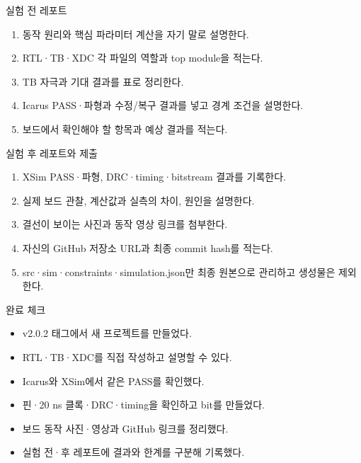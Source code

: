 \begin{frame}{실험 전 레포트}
\small
\begin{enumerate}
\item 동작 원리와 핵심 파라미터 계산을 자기 말로 설명한다.
\item RTL·TB·XDC 각 파일의 역할과 top module을 적는다.
\item TB 자극과 기대 결과를 표로 정리한다.
\item Icarus PASS·파형과 수정/복구 결과를 넣고 경계 조건을 설명한다.
\item 보드에서 확인해야 할 항목과 예상 결과를 적는다.
\end{enumerate}
\end{frame}

\begin{frame}{실험 후 레포트와 제출}
\small
\begin{enumerate}
\item XSim PASS·파형, DRC·timing·bitstream 결과를 기록한다.
\item 실제 보드 관찰, 계산값과 실측의 차이, 원인을 설명한다.
\item 결선이 보이는 사진과 동작 영상 링크를 첨부한다.
\item 자신의 GitHub 저장소 URL과 최종 commit hash를 적는다.
\item src·sim·constraints·simulation.json만 최종 원본으로 관리하고 생성물은 제외한다.
\end{enumerate}
\end{frame}

\begin{frame}{완료 체크}
\small
\begin{itemize}
\item[$\square$] v2.0.2 태그에서 새 프로젝트를 만들었다.
\item[$\square$] RTL·TB·XDC를 직접 작성하고 설명할 수 있다.
\item[$\square$] Icarus와 XSim에서 같은 PASS를 확인했다.
\item[$\square$] 핀·20 ns 클록·DRC·timing을 확인하고 bit를 만들었다.
\item[$\square$] 보드 동작 사진·영상과 GitHub 링크를 정리했다.
\item[$\square$] 실험 전·후 레포트에 결과와 한계를 구분해 기록했다.
\end{itemize}
\end{frame}

